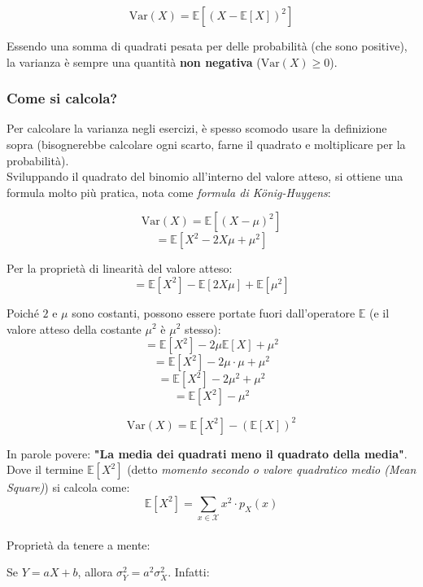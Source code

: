 \begin{equation}
\boxed{\text{Var}(X) = \mathbb{E}\left[ (X - \mathbb{E}[X])^2 \right]}
\end{equation}

Essendo una somma di quadrati pesata per delle probabilità (che sono positive), la varianza è sempre una quantità \textbf{non negativa} ($\text{Var}(X) \ge 0$).

\subsubsection{Come si calcola?}

Per calcolare la varianza negli esercizi, è spesso scomodo usare la definizione sopra (bisognerebbe calcolare ogni scarto, farne il quadrato e moltiplicare per la probabilità).
\\Sviluppando il quadrato del binomio all'interno del valore atteso, si ottiene una formula molto più pratica, nota come \textit{formula di König-Huygens}:

$$ \text{Var}(X) = \mathbb{E}[(X - \mu)^2] $$
$$ = \mathbb{E}[X^2 - 2X\mu + \mu^2] $$

Per la proprietà di linearità del valore atteso:
$$ = \mathbb{E}[X^2] - \mathbb{E}[2X\mu] + \mathbb{E}[\mu^2] $$

Poiché $2$ e $\mu$ sono costanti, possono essere portate fuori dall'operatore $\mathbb{E}$ (e il valore atteso della costante $\mu^2$ è $\mu^2$ stesso):
$$ = \mathbb{E}[X^2] - 2\mu \mathbb{E}[X] + \mu^2 $$
$$ = \mathbb{E}[X^2] - 2\mu \cdot \mu + \mu^2 $$
$$ = \mathbb{E}[X^2] - 2\mu^2 + \mu^2 $$
$$ = \mathbb{E}[X^2] - \mu^2 $$

\begin{equation}
\boxed{\text{Var}(X) = \mathbb{E}[X^2] - (\mathbb{E}[X])^2}
\end{equation}

In parole povere: \textbf{"La media dei quadrati meno il quadrato della media"}.
Dove il termine $\mathbb{E}[X^2]$ (detto \textit{momento secondo o valore quadratico medio (Mean Square)}) si calcola come:
\[ \mathbb{E}[X^2] = \sum_{x \in \mathcal{X}} x^2 \cdot p_X(x) \]\\

Proprietà da tenere a mente:

Se $Y = aX + b$, allora $\sigma_Y^2 = a^2\sigma_X^2$. Infatti:

